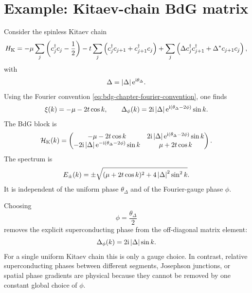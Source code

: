 \section{Example: Kitaev-chain BdG matrix}

Consider the spinless Kitaev chain
\begin{equation}
\label{eq:bdg-chapter-kitaev-real-space}
    H_{\rm K}
    =
    -\mu\sum_j\left(c_j^\dagger c_j-\frac12\right)
    -t\sum_j\left(c_j^\dagger c_{j+1}+c_{j+1}^\dagger c_j\right)
    +\sum_j
    \left(
        \Delta c_j^\dagger c_{j+1}^\dagger
        +\Delta^* c_{j+1}c_j
    \right),
\end{equation}
with
\begin{equation}
    \Delta=\left|\Delta\right|\mathrm{e}^{\mathrm{i}\theta_\Delta}.
\end{equation}
Using the Fourier convention \cref{eq:bdg-chapter-fourier-convention}, one finds
\begin{equation}
\label{eq:bdg-chapter-kitaev-xi-gap}
    \xi(k)=-\mu-2t\cos k,
    \qquad
    \Delta_\phi(k)
    =
    2\mathrm{i}\left|\Delta\right|\mathrm{e}^{\mathrm{i}(\theta_\Delta-2\phi)}\sin k.
\end{equation}
The BdG block is
\begin{equation}
\label{eq:bdg-chapter-kitaev-bdg-block}
    \mathcal{H}_{\rm K}(k)
    =
    \begin{pmatrix}
        -\mu-2t\cos k
        &
        2\mathrm{i}\left|\Delta\right|\mathrm{e}^{\mathrm{i}(\theta_\Delta-2\phi)}\sin k
        \\
        -2\mathrm{i}\left|\Delta\right|\mathrm{e}^{-\mathrm{i}(\theta_\Delta-2\phi)}\sin k
        &
        \mu+2t\cos k
    \end{pmatrix}.
\end{equation}
The spectrum is
\begin{equation}
\label{eq:bdg-chapter-kitaev-spectrum}
    E_\pm(k)
    =
    \pm\sqrt{(\mu+2t\cos k)^2+4\left|\Delta\right|^2\sin^2 k}.
\end{equation}
It is independent of the uniform phase $\theta_\Delta$ and of the Fourier-gauge
phase $\phi$.

Choosing
\begin{equation}
    \phi=\frac{\theta_\Delta}{2}
\end{equation}
removes the explicit superconducting phase from the off-diagonal matrix element:
\begin{equation}
    \Delta_\phi(k)=2\mathrm{i}\left|\Delta\right|\sin k.
\end{equation}
For a single uniform Kitaev chain this is only a gauge choice.  In contrast,
relative superconducting phases between different segments, Josephson junctions,
or spatial phase gradients are physical because they cannot be removed by one
constant global choice of $\phi$.

